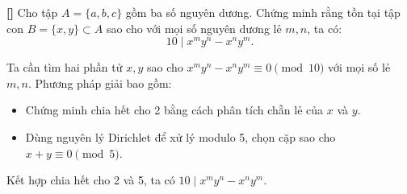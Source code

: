 \documentclass[../05-modular-arithmetic-a.tex]{subfiles}
\begin{document}
\begin{example*}\label{example:EGMO-2015-P1}\textbf{[]}
	Cho tập \( A = \{a, b, c\} \) gồm ba số nguyên dương.
	Chứng minh rằng tồn tại tập con \( B = \{x, y\} \subset A \) sao cho với mọi số nguyên dương lẻ \( m, n \), ta có:
	\[
		10 \mid x^m y^n - x^n y^m.
	\]
\end{example*}

\begin{story*}
    Ta cần tìm hai phần tử \( x, y \) sao cho \( x^m y^n - x^n y^m \equiv 0 \pmod{10} \) với mọi số lẻ \( m, n \). Phương pháp giải bao gồm:
    \begin{itemize}[topsep=0pt, partopsep=0pt, itemsep=0pt]
        \item Chứng minh chia hết cho 2 bằng cách phân tích chẵn lẻ của \( x \) và \( y \).
        \item Dùng nguyên lý Dirichlet để xử lý modulo 5, chọn cặp sao cho \( x + y \equiv 0 \pmod{5} \).
    \end{itemize}
    Kết hợp chia hết cho 2 và 5, ta có \( 10 \mid x^m y^n - x^n y^m \).
\end{story*}

\bigbreak
\end{document}
